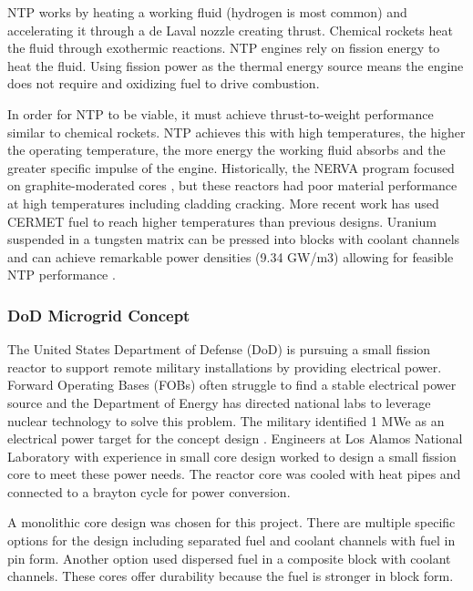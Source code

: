     NTP works by heating a working fluid (hydrogen is most common) and
    accelerating it through a de Laval nozzle creating thrust. Chemical rockets
    heat the fluid through exothermic reactions. NTP engines rely on fission
    energy to heat the fluid. Using fission power as the thermal energy source means the engine does not require and
    oxidizing fuel to drive combustion.

    In order for NTP to be viable, it must achieve thrust-to-weight performance
    similar to chemical rockets. NTP achieves this with high temperatures, the
    higher the operating temperature, the more energy the working fluid absorbs
    and the greater specific impulse of the engine. Historically, the NERVA
    program focused on graphite-moderated cores \citep{webb_combined_2011}, but
    these reactors had poor material performance at high temperatures including
    cladding cracking. More recent work has used CERMET fuel to reach higher
    temperatures than previous designs. Uranium suspended in a tungsten matrix
    can be pressed into blocks with coolant channels and can achieve remarkable
    power densities (9.34 GW/m3) allowing for feasible NTP performance
    \citep{webb_combined_2011}.

    \subsubsection{DoD Microgrid Concept}
    The United States Department of Defense (DoD) is pursuing a small fission
    reactor to support remote military installations by providing electrical
    power. Forward Operating Bases (FOBs) often struggle to find a stable
    electrical power source and the Department of Energy has directed national
    labs to leverage nuclear technology to solve this problem. The military
    identified 1 MWe as an electrical power target for the concept design
    \citep{army_reactor_slides}.
    Engineers at Los Alamos National Laboratory with experience in small core
    design worked to design a small fission core to meet these power needs. The
    reactor core was cooled with heat pipes and connected to a brayton cycle for
    power conversion.

    A monolithic core design was chosen for this project. There are multiple
    specific options for the design including separated fuel and coolant
    channels with fuel in pin form. Another option used dispersed fuel in a
    composite block with coolant channels. These cores offer durability because
    the fuel is stronger in block form.

